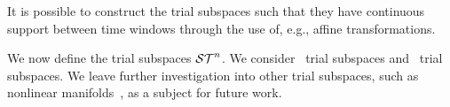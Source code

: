 \begin{remark}
It is possible to construct the trial subspaces such that they have continuous support between time windows through the 
use of, e.g., affine transformations.
\end{remark}
We now define the trial subspaces $\mathcal{ ST }^{n}$. We consider \spatialAcronym\ trial subspaces and \spaceTimeAcronym\ trial subspaces. 
We leave further investigation into other trial subspaces, such as nonlinear manifolds~\cite{leeCarlberg}, as a subject for future work.

